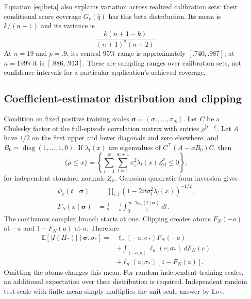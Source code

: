 \documentclass[nolineno]{ieeeaccess}
\newcommand{\E}{\mathbb{E}}
\newcommand{\diag}{\operatorname{diag}}
\begin{document}
Equation \eqref{eq:beta} also explains variation across realized calibration sets: their conditional score coverage $G_r(\widehat q)$ has this beta distribution. Its mean is $k/(n+1)$ and its variance is
\begin{equation}
\frac{k(n+1-k)}{(n+1)^2(n+2)}.
\end{equation}
At $n=19$ and $p=.9$, its central 95\% range is approximately $[.740,.987]$; at $n=1999$ it is $[.886,.913]$. These are sampling ranges over calibration sets, not confidence intervals for a particular application's achieved coverage.

\subsection{Coefficient-estimator distribution and clipping}
Condition on fixed positive training scales $\boldsymbol\sigma=(\sigma_1,\ldots,\sigma_N)$. Let $C$ be a Cholesky factor of the full-episode correlation matrix with entries $\rho^{|j-l|}$. Let $A$ have $1/2$ on the first upper and lower diagonals and zero elsewhere, and $B_0=\diag(1,\ldots,1,0)$. If $\lambda_l(x)$ are eigenvalues of $C^\top(A-xB_0)C$, then
\begin{equation}
\{\widetilde\rho\leq x\}=
\left\{\sum_{i=1}^N\sum_{l=1}^{m+1}\sigma_i^2\lambda_l(x)Z_{il}^2\leq0\right\},
\end{equation}
for independent standard normals $Z_{il}$. Gaussian quadratic-form inversion \cite{imhof1961} gives
\begin{align}
\psi_x(t\mid\boldsymbol\sigma)
 &=\prod_{i,l}(1-2it\sigma_i^2\lambda_l(x))^{-1/2},\nonumber\\
F_N(x\mid\boldsymbol\sigma)
 &=\frac12-\frac1\pi\int_0^\infty\frac{\Im\psi_x(t\mid\boldsymbol\sigma)}{t}\,dt.
\label{eq:trainingcdf}
\end{align}
The continuous complex branch starts at one. Clipping creates atoms $F_N(-a)$ at $-a$ and $1-F_N(a)$ at $a$. Therefore
\begin{align}
\E[|I(H_*)|\mid\boldsymbol\sigma,\sigma_*]
={}&\ell_n(-a;\sigma_*)F_N(-a)\nonumber\\
 &+\int_{(-a,a)}\ell_n(r;\sigma_*)\,dF_N(r)\nonumber\\
 &+\ell_n(a;\sigma_*)[1-F_N(a)].
\label{eq:fullmean}
\end{align}
Omitting the atoms changes this mean. For random independent training scales, an additional expectation over their distribution is required. Independent random test scale with finite mean simply multiplies the unit-scale answer by $\E\sigma_*$.
\end{document}
